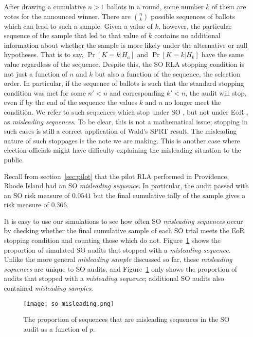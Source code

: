 After drawing a cumulative $n>1$ ballots in a round, some number $k$ of them are votes for the announced winner. There are $\binom{n}{k}$ possible sequences of ballots which can lead to such a sample. Given a value of $k$, however, the particular sequence of the sample that led to that value of $k$ contains no additional information about whether the sample is more likely under the alternative or null hypotheses. That is to say, $\Pr[K=k|H_a]$ and $\Pr[K=k|H_0]$ have the same value regardless of the sequence.
Despite this, the SO \BRAVO RLA stopping condition is not just a function of $n$ and $k$ but also a function of the sequence, the selection order. In particular, if the sequence of ballots is such that the standard \BRAVO stopping condition was met for some $n'<n$ and corresponding $k'<n$, the audit will stop, even if by the end of the sequence the values $k$ and $n$ no longer meet the \BRAVO condition. We refer to such sequences which stop under SO \BRAVO, but not under EoR \BRAVO, as \emph{misleading sequences}. To be clear, this is not a mathematical issue; stopping in such cases is still a correct application of Wald's SPRT result\cite{wald}. The misleading nature of such stoppages is the note we are making. This is another case where election officials might have difficulty explaining the misleading situation to the public.

Recall from section~\ref{sec:pilot} that the pilot \Providence RLA performed in Providence, Rhode Island had an SO \BRAVO \emph{misleading sequence}. In particular, the audit passed with an SO \BRAVO risk measure of $0.0541$ but the final cumulative tally of the sample gives a \BRAVO risk measure of $0.366$.

It is easy to use our simulations to see how often SO \BRAVO \emph{misleading sequences} occur by checking whether the final cumulative sample of each SO \BRAVO trial meets the EoR \BRAVO stopping condition and counting those which do not. Figure~\ref{so_misleading} shows the proportion of simulated SO \BRAVO audits that stopped with a \emph{misleading sequence}. Unlike the more general \emph{misleading sample} discussed so far, these \emph{misleading sequences} are unique to SO \BRAVO audits, and Figure~\ref{so_misleading} only shows the proportion of audits that stopped with a \emph{misleading sequence}; additional SO \BRAVO audits also contained \emph{misleading samples}.

\begin{figure}
\texttt{[image: so\_misleading.png]}
\caption{The proportion of sequences that are misleading sequences in the SO \BRAVO audit as a function of $p$.}
\label{so_misleading}
\end{figure}




